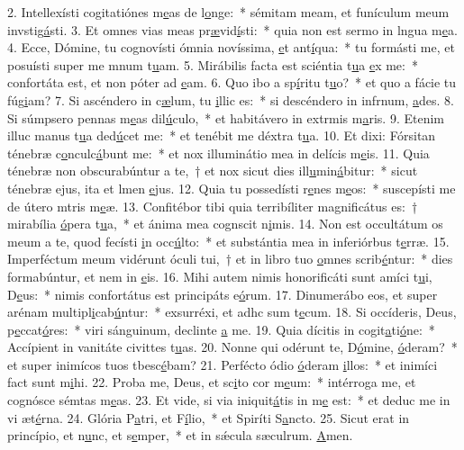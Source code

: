 2. Intellexísti cogitatiónes m\uline{e}as de l\uline{o}nge:~* sémitam meam, et funículum meum invstig\uline{á}sti.
3. Et omnes vias meas pr\uline{æ}vid\uline{í}sti:~* quia non est sermo in lngua m\uline{e}a.
4. Ecce, Dómine, tu cognovísti ómnia novíssima, \uline{e}t ant\uline{í}qua:~* tu formásti me, et posuísti super me mnum t\uline{u}am.
5. Mirábilis facta est sciéntia t\uline{u}a \uline{e}x me:~* confortáta est, et non póter ad \uline{e}am.
6. Quo ibo a sp\uline{í}ritu t\uline{u}o?~* et quo a fácie tu fúg\uline{i}am?
7. Si ascéndero in c\uline{æ}lum, tu \uline{i}llic es:~* si descéndero in infrnum, \uline{a}des.
8. Si súmpsero pennas m\uline{e}as dil\uline{ú}culo,~* et habitávero in extrmis m\uline{a}ris.
9. Etenim illuc manus t\uline{u}a ded\uline{ú}cet me:~* et tenébit me déxtra t\uline{u}a.
10. Et dixi: Fórsitan ténebræ c\uline{o}nculc\uline{á}bunt me:~* et nox illuminátio mea in delícis m\uline{e}is.
11. Quia ténebræ non obscurabúntur a te,~† et nox sicut dies ill\uline{u}min\uline{á}bitur:~* sicut ténebræ ejus, ita et lmen \uline{e}jus.
12. Quia tu possedísti r\uline{e}nes m\uline{e}os:~* suscepísti me de útero mtris m\uline{e}æ.
13. Confitébor tibi quia terribíliter magnificátus es:~† mirabília \uline{ó}pera t\uline{u}a,~* et ánima mea cognscit n\uline{i}mis.
14. Non est occultátum os meum a te, quod fecísti \uline{i}n occ\uline{ú}lto:~* et substántia mea in inferiórbus t\uline{e}rræ.
15. Imperféctum meum vidérunt óculi tui,~† et in libro tuo \uline{o}mnes scrib\uline{é}ntur:~* dies formabúntur, et nem in \uline{e}is.
16. Mihi autem nimis honorificáti sunt amíci t\uline{u}i, D\uline{e}us:~* nimis confortátus est principáts e\uline{ó}rum.
17. Dinumerábo eos, et super arénam multipl\uline{i}cab\uline{ú}ntur:~* exsurréxi, et adhc sum t\uline{e}cum.
18. Si occíderis, Deus, p\uline{e}ccat\uline{ó}res:~* viri sánguinum, declinte \uline{a} me.
19. Quia dícitis in cogit\uline{a}ti\uline{ó}ne:~* Accípient in vanitáte civittes t\uline{u}as.
20. Nonne qui odérunt te, D\uline{ó}mine, \uline{ó}deram?~* et super inimícos tuos tbesc\uline{é}bam?
21. Perfécto ódio \uline{ó}deram \uline{i}llos:~* et inimíci fact sunt m\uline{i}hi.
22. Proba me, Deus, et sc\uline{i}to cor m\uline{e}um:~* intérroga me, et cognósce sémtas m\uline{e}as.
23. Et vide, si via iniquit\uline{á}tis in m\uline{e} est:~* et deduc me in vi æt\uline{é}rna.
24. Glória P\uline{a}tri, et F\uline{í}lio,~* et Spiríti S\uline{a}ncto.
25. Sicut erat in princípio, et n\uline{u}nc, et s\uline{e}mper,~* et in sǽcula sæculrum. \uline{A}men.
